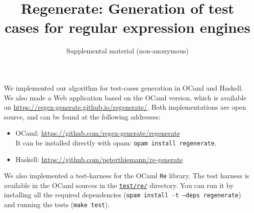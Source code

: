 \documentclass{acmart}
\title{Regenerate: Generation of test cases for regular expression engines}
\subtitle{Supplemental material (non-anonymous)}
\begin{document}
\maketitle

We implemented our algorithm for test-cases generation in OCaml and Haskell.
We also made a Web application based on the OCaml version, which
is available on \url{https://regex-generate.github.io/regenerate/}.
Both implementations are open source, and can be found at the following
addresses:
\begin{itemize}
\item OCaml: \url{https://github.com/regex-generate/regenerate}\\
  It can be installed directly with opam: \texttt{opam install regenerate}.
\item Haskell: \url{https://github.com/peterthiemann/re-generate}
\end{itemize}

We also implemented a test-harness for the OCaml \texttt{Re} library.
The test harness is available in the OCaml sources in the \href{https://github.com/regex-generate/regenerate/tree/master/test/re}{\texttt{test/re/}} directory. You can run it by installing all the required dependencies (\texttt{opam install -t --deps regenerate}) and running the tests (\texttt{make test}).
  
\end{document}
